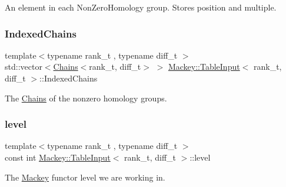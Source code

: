 An element in each Non\+Zero\+Homology group. Stores position and multiple. 

\mbox{\label{classMackey_1_1TableInput_aa612b7b41454848c19d3192ab6211ee4}} 
\subsubsection{\texorpdfstring{Indexed\+Chains}{IndexedChains}}
{\footnotesize\ttfamily template$<$typename rank\+\_\+t , typename diff\+\_\+t $>$ \\
std\+::vector$<$\hyperlink{classMackey_1_1Chains}{Chains}$<$rank\+\_\+t, diff\+\_\+t$>$ $>$ \hyperlink{classMackey_1_1TableInput}{Mackey\+::\+Table\+Input}$<$ rank\+\_\+t, diff\+\_\+t $>$\+::Indexed\+Chains\hspace{0.3cm}{\ttfamily [protected]}}



The \hyperlink{classMackey_1_1Chains}{Chains} of the nonzero homology groups. 

\mbox{\label{classMackey_1_1TableInput_afa9c0057ffdcded31253a9f5dfbeaa2d}} 
\subsubsection{\texorpdfstring{level}{level}}
{\footnotesize\ttfamily template$<$typename rank\+\_\+t , typename diff\+\_\+t $>$ \\
const int \hyperlink{classMackey_1_1TableInput}{Mackey\+::\+Table\+Input}$<$ rank\+\_\+t, diff\+\_\+t $>$\+::level\hspace{0.3cm}{\ttfamily [protected]}}



The \hyperlink{namespaceMackey}{Mackey} functor level we are working in. 

\mbox{\label{classMackey_1_1TableInput_a56448ebdfecb95da4c52349d4ccbf576}} 
